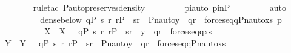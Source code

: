 \begin{isabellebody}
\ \ \ \ \ \ \isamarkupfalse%
\ {\isacharparenleft}{\kern0pt}rule{\isacharunderscore}{\kern0pt}tac\ P{\isacharunderscore}{\kern0pt}auto{\isacharunderscore}{\kern0pt}preserves{\isacharunderscore}{\kern0pt}density{\isacharprime}{\kern0pt}{\isacharparenright}{\kern0pt}\ \isanewline
\ \ \ \ \ \ \isamarkupfalse%
\ piauto\ pinP\ \isanewline
\ \ \ \ \ \ \isamarkupfalse%
\ auto\ \isanewline
\ \ \ \ \isamarkupfalse%
\ \isamarkupfalse%
\ {\isachardoublequoteopen}{\isachardot}{\kern0pt}{\isachardot}{\kern0pt}{\isachardot}{\kern0pt}\ {\isasymlongleftrightarrow}\ dense{\isacharunderscore}{\kern0pt}below{\isacharparenleft}{\kern0pt}{\isacharbraceleft}{\kern0pt}\ q{\isasymin}P{\isachardot}{\kern0pt}\ {\isasymexists}s{\isachardot}{\kern0pt}\ {\isasymexists}r{\isachardot}{\kern0pt}\ r{\isasymin}P\ {\isasymand}\ {\isasymlangle}s{\isacharcomma}{\kern0pt}r{\isasymrangle}\ {\isasymin}\ Pn{\isacharunderscore}{\kern0pt}auto{\isacharparenleft}{\kern0pt}{\isasympi}{\isacharparenright}{\kern0pt}{\isacharbackquote}{\kern0pt}y\ {\isasymand}\ q{\isasympreceq}r\ {\isasymand}\ forces{\isacharunderscore}{\kern0pt}eq{\isacharparenleft}{\kern0pt}q{\isacharcomma}{\kern0pt}Pn{\isacharunderscore}{\kern0pt}auto{\isacharparenleft}{\kern0pt}{\isasympi}{\isacharparenright}{\kern0pt}{\isacharbackquote}{\kern0pt}x{\isacharcomma}{\kern0pt}s{\isacharparenright}{\kern0pt}{\isacharbraceright}{\kern0pt}{\isacharcomma}{\kern0pt}\ {\isasympi}{\isacharbackquote}{\kern0pt}p{\isacharparenright}{\kern0pt}{\isachardoublequoteclose}\ \isanewline
\ \ \ \ \isamarkupfalse%
\ {\isacharminus}{\kern0pt}\ \isanewline
\ \ \ \ \ \ \isamarkupfalse%
\ X\ \ {\isachardoublequoteopen}X\ {\isasymequiv}\ {\isacharbraceleft}{\kern0pt}\ q{\isasymin}P{\isachardot}{\kern0pt}\ {\isasymexists}s{\isachardot}{\kern0pt}\ {\isasymexists}r{\isachardot}{\kern0pt}\ r{\isasymin}P\ {\isasymand}\ {\isasymlangle}s{\isacharcomma}{\kern0pt}r{\isasymrangle}\ {\isasymin}\ y\ {\isasymand}\ q{\isasympreceq}r\ {\isasymand}\ forces{\isacharunderscore}{\kern0pt}eq{\isacharparenleft}{\kern0pt}q{\isacharcomma}{\kern0pt}x{\isacharcomma}{\kern0pt}s{\isacharparenright}{\kern0pt}{\isacharbraceright}{\kern0pt}\ {\isachardoublequoteclose}\isanewline
\ \ \ \ \ \ \isamarkupfalse%
\ Y\ \ {\isachardoublequoteopen}Y\ {\isasymequiv}\ {\isacharbraceleft}{\kern0pt}\ q{\isasymin}P{\isachardot}{\kern0pt}\ {\isasymexists}s{\isachardot}{\kern0pt}\ {\isasymexists}r{\isachardot}{\kern0pt}\ r{\isasymin}P\ {\isasymand}\ {\isasymlangle}s{\isacharcomma}{\kern0pt}r{\isasymrangle}\ {\isasymin}\ Pn{\isacharunderscore}{\kern0pt}auto{\isacharparenleft}{\kern0pt}{\isasympi}{\isacharparenright}{\kern0pt}{\isacharbackquote}{\kern0pt}y\ {\isasymand}\ q{\isasympreceq}r\ {\isasymand}\ forces{\isacharunderscore}{\kern0pt}eq{\isacharparenleft}{\kern0pt}q{\isacharcomma}{\kern0pt}Pn{\isacharunderscore}{\kern0pt}auto{\isacharparenleft}{\kern0pt}{\isasympi}{\isacharparenright}{\kern0pt}{\isacharbackquote}{\kern0pt}x{\isacharcomma}{\kern0pt}s{\isacharparenright}{\kern0pt}{\isacharbraceright}{\kern0pt}\ {\isachardoublequoteclose}\isanewline

\end{isabellebody}
